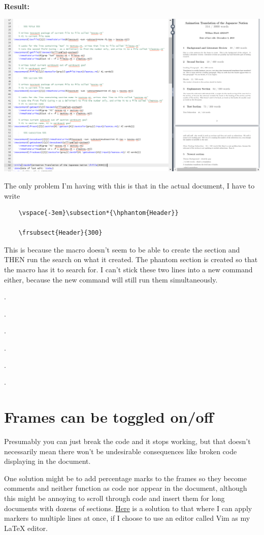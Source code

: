 \documentclass[12pt]{article}
\begin{document}
\textbf{Result:}

\includegraphics[width=\textwidth]{imgelaborationfullcountsubcount.PNG}

The only problem I'm having with this is that in the actual document, I have to write 
\begin{verbatim}
    \vspace{-3em}\subsection*{\hphantom{Header}}

    \frsubsect{Header}{300}
\end{verbatim}
This is because the macro doesn't seem to be able to create the section and THEN run the search on what it created. The phantom section is created so that the macro has it to search for. I can't stick these two lines into a new command either, because the new command will still run them simultaneously.


.

.

.

.

.

.

\section{\large Frames can be toggled on/off} 

Presumably you can just break the code and it stops working, but that doesn't necessarily mean there won't be undesirable consequences like broken code displaying in the document.

One solution might be to add percentage marks to the frames so they become comments and neither function as code nor appear in the document, although this might be annoying to scroll through code and insert them for long documents with dozens of sections. \href{https://vim.fandom.com/wiki/Inserting_text_in_multiple_lines}{Here} is a solution to that where I can apply markers to multiple lines at once, if I choose to use an editor called Vim as my LaTeX editor.
\end{document}
